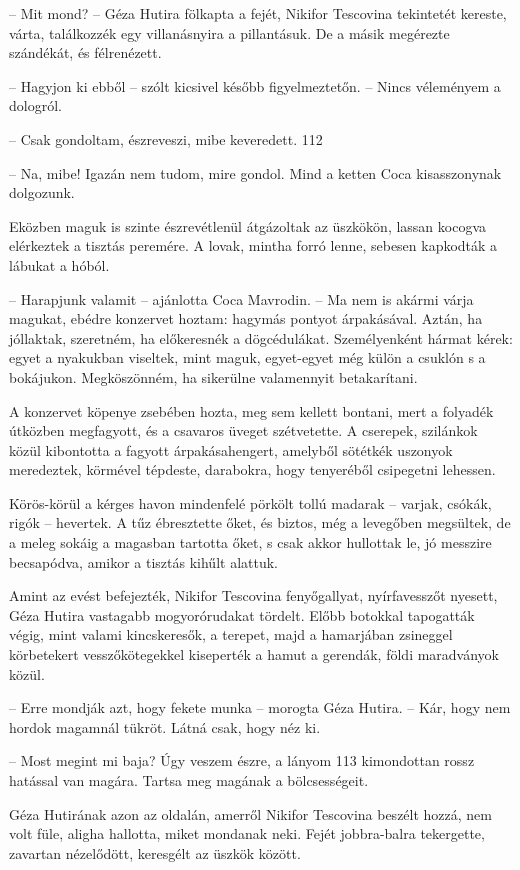 \documentclass{IEEEtran}
\begin{document}
– Mit mond? – Géza Hutira fölkapta a fejét, Nikifor Tescovina tekintetét
kereste, várta, találkozzék egy villanásnyira a pillantásuk. De a másik
megérezte szándékát, és félrenézett.

– Hagyjon ki ebből – szólt kicsivel később figyelmeztetőn. – Nincs véleményem
a dologról.

– Csak gondoltam, észreveszi, mibe keveredett.
112

– Na, mibe! Igazán nem tudom, mire gondol. Mind a ketten Coca kisasszonynak
dolgozunk.

Eközben maguk is szinte észrevétlenül átgázoltak az üszkökön, lassan kocogva
elérkeztek a tisztás peremére. A lovak, mintha forró lenne, sebesen kapkodták
a lábukat a hóból.

– Harapjunk valamit – ajánlotta Coca Mavrodin. – Ma nem is akármi várja
magukat, ebédre konzervet hoztam: hagymás pontyot árpakásával. Aztán, ha
jóllaktak, szeretném, ha előkeresnék a dögcédulákat. Személyenként hármat
kérek: egyet a nyakukban viseltek, mint maguk, egyet-egyet még külön a csuklón
s a bokájukon. Megköszönném, ha sikerülne valamennyit betakarítani.

A konzervet köpenye zsebében hozta, meg sem kellett bontani, mert a folyadék
útközben megfagyott, és a csavaros üveget szétvetette. A cserepek, szilánkok
közül kibontotta a fagyott árpakásahengert, amelyből sötétkék uszonyok
meredeztek, körmével tépdeste, darabokra, hogy tenyeréből csipegetni lehessen.

Körös-körül a kérges havon mindenfelé pörkölt tollú madarak – varjak, csókák,
rigók – hevertek. A tűz ébresztette őket, és biztos, még a levegőben
megsültek, de a meleg sokáig a magasban tartotta őket, s csak akkor hullottak
le, jó messzire becsapódva, amikor a tisztás kihűlt alattuk.

Amint az evést befejezték, Nikifor Tescovina fenyőgallyat, nyírfavesszőt
nyesett, Géza Hutira vastagabb mogyorórudakat tördelt. Előbb botokkal
tapogatták végig, mint valami kincskeresők, a terepet, majd a hamarjában
zsineggel körbetekert vesszőkötegekkel kiseperték a hamut a gerendák, földi
maradványok közül.

– Erre mondják azt, hogy fekete munka – morogta Géza Hutira. – Kár, hogy nem
hordok magamnál tükröt. Látná csak, hogy néz ki.

– Most megint mi baja? Úgy veszem észre, a lányom 113 kimondottan rossz
hatással van magára. Tartsa meg magának a bölcsességeit.

Géza Hutirának azon az oldalán, amerről Nikifor Tescovina beszélt hozzá, nem
volt füle, aligha hallotta, miket mondanak neki. Fejét jobbra-balra
tekergette, zavartan nézelődött, keresgélt az üszkök között.
\end{document}
